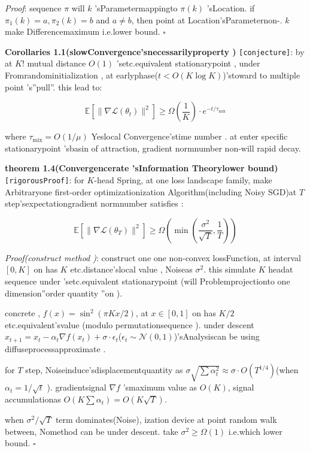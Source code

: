 \documentclass[
  12pt,
]{article}
\begin{document}
\emph{Proof}: sequence  \(\pi\) will  \(k\) 'sParametermappingto  \(\pi(k)\)
'sLocation. if  \(\pi_1(k) = a, \pi_2(k) = b\) and 
\(a \neq b\), then point at Location'sParameternon-.  \(k\)
make Differencemaximum i.e.lower bound. \(\square\)

\textbf{Corollaries 1.1(slowConvergence'snecessarilyproperty )} \texttt{{[}conjecture{]}}: by at  \(K!\)
mutual distance \(O(1)\)
'setc.equivalent stationarypoint , under Fromrandominitialization , at earlyphase(\(t < O(K \log K)\))'stoward to multiple point 's''pull''. this lead to: 

\[\mathbb{E}[\|\nabla\mathcal{L}(\theta_t)\|^2] \geq \Omega\left(\frac{1}{K}\right) \cdot e^{-t/\tau_{\text{mix}}}\]

where \(\tau_{\text{mix}} = O(1/\mu)\)
Yeslocal Convergence'stime number . at enter specific stationarypoint 'sbasin of attraction, gradient normnumber non-will rapid decay. 

\textbf{theorem  1.4(Convergencerate 'sInformation Theorylower bound)} \texttt{{[}rigorousProof{]}}: for 
\(K\)-head Spring, at one loss landscape family, make Arbitraryone first-order optimizationization Algorithm(including  Noisy
SGD)at  \(T\) step'sexpectationgradient normnumber satisfies : 

\[\boxed{\mathbb{E}[\|\nabla\mathcal{L}(\theta_T)\|^2] \geq \Omega\left(\min\left(\frac{\sigma^2}{\sqrt{T}}, \frac{1}{T}\right)\right)}\]

\emph{Proof(construct method )}: construct one one non-convex lossFunction, at interval \([0, K]\) on has 
\(K\) etc.distance'slocal value , Noiseas  \(\sigma^2\). this simulate \(K\)
headat sequence under 'setc.equivalent stationarypoint (will Problemprojectionto one dimension''order quantity ''on ). 

concrete ,  \(f(x) = \sin^2(\pi K x / 2)\), at  \(x \in [0,1]\) on has 
\(K/2\) etc.equivalent'svalue (modulo permutationsequence ). under descent
\(x_{t+1} = x_t - \alpha_t \nabla f(x_t) + \sigma \cdot \epsilon_t\)(\(\epsilon_t \sim \mathcal{N}(0,1)\))'sAnalysiscan be using diffuseprocessapproximate . 

for  \(T\) step, Noiseinduce'sdisplacementquantity as 
\(\sigma \sqrt{\sum \alpha_t^2} \approx \sigma \cdot O(T^{1/4})\)(when 
\(\alpha_t = 1/\sqrt{t}\) ). gradientsignal \(\nabla f\) 'smaximum value as 
\(O(K)\), signal accumulationas  \(O(K \sum \alpha_t) = O(K\sqrt{T})\). 

when  \(\sigma^2 / \sqrt{T}\)
term dominates(Noise), ization device at point random walk between, Nomethod can be under descent. take
\(\sigma^2 \geq \Omega(1)\) i.e.which lower bound. \(\square\)
\end{document}
